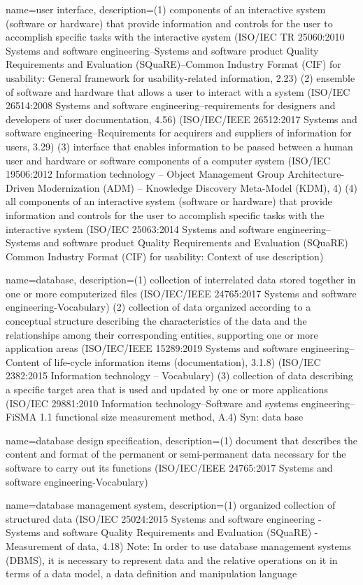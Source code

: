 {
    name={user interface},
    description={(1) components of an interactive system (software or hardware) that provide information and controls for the user to accomplish specific tasks with the interactive system (ISO/IEC TR 25060:2010 Systems and software engineering--Systems and software product Quality Requirements and Evaluation (SQuaRE)--Common Industry Format (CIF) for usability: General framework for usability-related information, 2.23) (2) ensemble of software and hardware that allows a user to interact with a system (ISO/IEC 26514:2008 Systems and software engineering--requirements for designers and developers of user documentation, 4.56) (ISO/IEC/IEEE 26512:2017 Systems and software engineering--Requirements for acquirers and suppliers of information for users, 3.29) (3) interface that enables information to be passed between a human user and hardware or software components of a computer system (ISO/IEC 19506:2012 Information technology -- Object Management Group Architecture-Driven Modernization (ADM) -- Knowledge Discovery Meta-Model (KDM), 4) (4) all components of an interactive system (software or hardware) that provide information and controls for the user to accomplish specific tasks with the interactive system (ISO/IEC 25063:2014 Systems and software engineering--Systems and software product Quality Requirements and Evaluation (SQuaRE) Common Industry Format (CIF) for usability: Context of use description)    }
}

{
    name={database},
    description={(1) collection of interrelated data stored together in one or more computerized files (ISO/IEC/IEEE 24765:2017 Systems and software engineering-Vocabulary) (2) collection of data organized according to a conceptual structure describing the characteristics of the data and the relationships among their corresponding entities, supporting one or more application areas (ISO/IEC/IEEE 15289:2019 Systems and software engineering--Content of life-cycle information items (documentation), 3.1.8) (ISO/IEC 2382:2015 Information technology -- Vocabulary) (3) collection of data describing a specific target area that is used and updated by one or more applications (ISO/IEC 29881:2010 Information technology--Software and systems engineering--FiSMA 1.1 functional size measurement method, A.4) Syn: data base}
}

{
    name={database design specification},
    description={(1) document that describes the content and format of the permanent or semi-permanent data necessary for the software to carry out its functions (ISO/IEC/IEEE 24765:2017 Systems and software engineering-Vocabulary)}
}

{
    name={database management system},
    description={(1) organized collection of structured data (ISO/IEC 25024:2015 Systems and software engineering - Systems and software Quality Requirements and Evaluation (SQuaRE) - Measurement of data, 4.18) Note: In order to use database management systems (DBMS), it is necessary to represent data and the relative operations on it in terms of a data model, a data definition and manipulation language}
}
